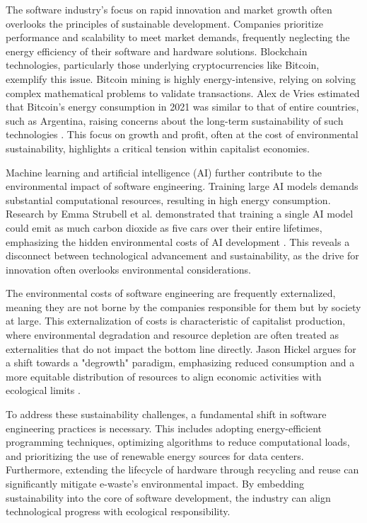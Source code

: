 \begin{refsection}
The software industry's focus on rapid innovation and market growth often overlooks the principles of sustainable development. Companies prioritize performance and scalability to meet market demands, frequently neglecting the energy efficiency of their software and hardware solutions. Blockchain technologies, particularly those underlying cryptocurrencies like Bitcoin, exemplify this issue. Bitcoin mining is highly energy-intensive, relying on solving complex mathematical problems to validate transactions. Alex de Vries estimated that Bitcoin's energy consumption in 2021 was similar to that of entire countries, such as Argentina, raising concerns about the long-term sustainability of such technologies \cite[pp.~118-121]{devries2021bitcoin}. This focus on growth and profit, often at the cost of environmental sustainability, highlights a critical tension within capitalist economies.

Machine learning and artificial intelligence (AI) further contribute to the environmental impact of software engineering. Training large AI models demands substantial computational resources, resulting in high energy consumption. Research by Emma Strubell et al. demonstrated that training a single AI model could emit as much carbon dioxide as five cars over their entire lifetimes, emphasizing the hidden environmental costs of AI development \cite[pp.~1-5]{strubell2019energy}. This reveals a disconnect between technological advancement and sustainability, as the drive for innovation often overlooks environmental considerations.

The environmental costs of software engineering are frequently externalized, meaning they are not borne by the companies responsible for them but by society at large. This externalization of costs is characteristic of capitalist production, where environmental degradation and resource depletion are often treated as externalities that do not impact the bottom line directly. Jason Hickel argues for a shift towards a "degrowth" paradigm, emphasizing reduced consumption and a more equitable distribution of resources to align economic activities with ecological limits \cite[pp.~75-78]{hickel2021less}.

To address these sustainability challenges, a fundamental shift in software engineering practices is necessary. This includes adopting energy-efficient programming techniques, optimizing algorithms to reduce computational loads, and prioritizing the use of renewable energy sources for data centers. Furthermore, extending the lifecycle of hardware through recycling and reuse can significantly mitigate e-waste's environmental impact. By embedding sustainability into the core of software development, the industry can align technological progress with ecological responsibility.


\end{refsection}
